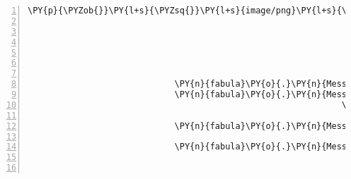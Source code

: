 \begin{Verbatim}[commandchars=\\\{\},numbers=left,firstnumber=1,stepnumber=1]
                                                                             \PY{p}{\PYZob{}}\PY{l+s}{\PYZsq{}}\PY{l+s}{image/png}\PY{l+s}{\PYZsq{}}\PY{p}{:} \PY{n}{fabula}\PY{o}{.}\PY{n}{Asset}\PY{p}{(}\PY{n}{uri}\PY{o}{=}\PY{l+s}{\PYZsq{}}\PY{l+s}{lute.png}\PY{l+s}{\PYZsq{}}\PY{p}{,}
                                                                                                        \PY{n}{data}\PY{o}{=}\PY{n+nb+bp}{None}\PY{p}{)}\PY{p}{,}
                                                                              \PY{l+s}{\PYZsq{}}\PY{l+s}{audio/ogg}\PY{l+s}{\PYZsq{}}\PY{p}{:} \PY{n}{fabula}\PY{o}{.}\PY{n}{Asset}\PY{p}{(}\PY{n}{uri}\PY{o}{=}\PY{l+s}{\PYZsq{}}\PY{l+s}{lute.ogg}\PY{l+s}{\PYZsq{}}\PY{p}{,}
                                                                                                        \PY{n}{data}\PY{o}{=}\PY{n+nb+bp}{None}\PY{p}{)}\PY{p}{,}
                                                                              \PY{l+s}{\PYZsq{}}\PY{l+s}{text/plain}\PY{l+s}{\PYZsq{}}\PY{p}{:} \PY{n}{fabula}\PY{o}{.}\PY{n}{Asset}\PY{p}{(}\PY{n}{uri}\PY{o}{=}\PY{l+s}{\PYZsq{}}\PY{l+s}{lute.txt}\PY{l+s}{\PYZsq{}}\PY{p}{,}
                                                                                                         \PY{n}{data}\PY{o}{=}\PY{n+nb+bp}{None}\PY{p}{)}\PY{p}{\PYZcb{}}\PY{p}{)}\PY{p}{,}
                                                               \PY{n}{room}\PY{o}{.}\PY{n}{entity\PYZus{}locations}\PY{p}{[}\PY{n}{ID\PYZus{}KUNI}\PY{p}{]} \PY{o}{+} \PY{p}{(}\PY{n}{room}\PY{o}{.}\PY{n}{identifier}\PY{p}{,}\PY{p}{)}\PY{p}{)}\PY{p}{]}\PY{p}{)}\PY{p}{,}
                             \PY{n}{fabula}\PY{o}{.}\PY{n}{Message}\PY{p}{(}\PY{p}{[}\PY{n}{fabula}\PY{o}{.}\PY{n}{DeleteEvent}\PY{p}{(}\PY{n}{identifier}\PY{o}{=}\PY{l+s}{\PYZsq{}}\PY{l+s}{lute\PYZus{}broken}\PY{l+s}{\PYZsq{}}\PY{p}{)}\PY{p}{]}\PY{p}{)}\PY{p}{,}
                             \PY{n}{fabula}\PY{o}{.}\PY{n}{Message}\PY{p}{(}\PY{p}{[}\PY{n}{fabula}\PY{o}{.}\PY{n}{SaysEvent}\PY{p}{(}\PY{n}{identifier}\PY{o}{=}\PY{n}{ID\PYZus{}KUNI}\PY{p}{,}
                                                              \PY{n}{text}\PY{o}{=}\PY{l+s}{\PYZsq{}}\PY{l+s}{Es hat funktioniert! }\PY{l+s}{\PYZsq{}}
                                                                   \PY{l+s}{\PYZsq{}}\PY{l+s}{Jetzt haben wir eine spielbare Laute.}\PY{l+s}{\PYZsq{}}\PY{p}{)}\PY{p}{]}\PY{p}{)}\PY{p}{,}
                             \PY{n}{fabula}\PY{o}{.}\PY{n}{Message}\PY{p}{(}\PY{p}{[}\PY{n}{fabula}\PY{o}{.}\PY{n}{PicksUpEvent}\PY{p}{(}\PY{n}{identifier}\PY{o}{=}\PY{n}{ID\PYZus{}KUNI}\PY{p}{,}
                                                                 \PY{n}{item\PYZus{}identifier}\PY{o}{=}\PY{l+s}{\PYZsq{}}\PY{l+s}{lute}\PY{l+s}{\PYZsq{}}\PY{p}{)}\PY{p}{]}\PY{p}{)}\PY{p}{,}
                             \PY{n}{fabula}\PY{o}{.}\PY{n}{Message}\PY{p}{(}\PY{p}{[}\PY{n}{fabula}\PY{o}{.}\PY{n}{PerceptionEvent}\PY{p}{(}\PY{n}{identifier}\PY{o}{=}\PY{n}{ID\PYZus{}CASSANDRA}\PY{p}{,}
                                                                    \PY{n}{perception}\PY{o}{=}\PY{l+s}{\PYZsq{}}\PY{l+s}{Kuni hat die Laute eingesteckt.}\PY{l+s}{\PYZsq{}}\PY{p}{)}\PY{p}{]}\PY{p}{)}\PY{p}{]}


\end{Verbatim}
